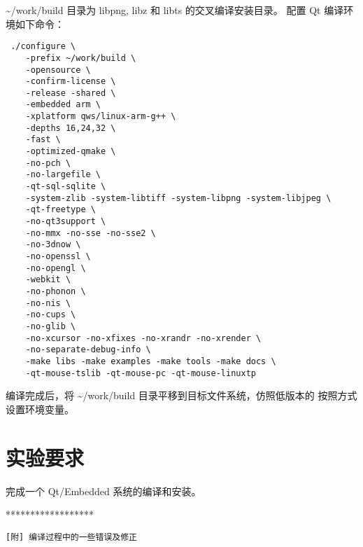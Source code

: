 \textasciitilde/work/build 目录为 libpng, libz 和 libts 的交叉编译安装目录。
配置 Qt 编译环境如下命令：
\begin{verbatim}
 ./configure \
    -prefix ~/work/build \
    -opensource \
    -confirm-license \
    -release -shared \
    -embedded arm \
    -xplatform qws/linux-arm-g++ \
    -depths 16,24,32 \
    -fast \
    -optimized-qmake \
    -no-pch \
    -no-largefile \
    -qt-sql-sqlite \
    -system-zlib -system-libtiff -system-libpng -system-libjpeg \
    -qt-freetype \
    -no-qt3support \
    -no-mmx -no-sse -no-sse2 \
    -no-3dnow \
    -no-openssl \
    -no-opengl \
    -webkit \
    -no-phonon \
    -no-nis \
    -no-cups \
    -no-glib \
    -no-xcursor -no-xfixes -no-xrandr -no-xrender \
    -no-separate-debug-info \
    -make libs -make examples -make tools -make docs \
    -qt-mouse-tslib -qt-mouse-pc -qt-mouse-linuxtp
\end{verbatim}

编译完成后，将 \textasciitilde/work/build 目录平移到目标文件系统，仿照低版本的
按照方式设置环境变量。

\section{实验要求}
完成一个 Qt/Embedded 系统的编译和安装。

\newpage
\begin{center} ****************** \end{center}
\tt [附] 编译过程中的一些错误及修正

